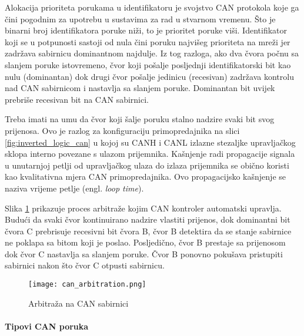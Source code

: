 Alokacija prioriteta porukama u identifikatoru je svojstvo CAN protokola koje ga čini pogodnim za upotrebu u sustavima za rad u stvarnom vremenu. Što je binarni broj identifikatora poruke niži, to je prioritet poruke viši. Identifikator koji se u potpunosti sastoji od nula čini poruku najvišeg prioriteta na mreži jer zadržava sabirnicu dominantnom najdulje. Iz tog razloga, ako dva čvora počnu sa slanjem poruke istovremeno, čvor koji pošalje posljednji identifikatorski bit kao nulu (dominantan) dok drugi čvor pošalje jedinicu (recesivan) zadržava kontrolu nad CAN sabirnicom i nastavlja sa slanjem poruke. Dominantan bit uvijek prebriše recesivan bit na CAN sabirnici.

Treba imati na umu da čvor koji šalje poruku stalno nadzire svaki bit svog prijenosa. Ovo je razlog za konfiguraciju primopredajnika na slici \ref{fig:inverted_logic_can} u kojoj su CANH i CANL izlazne stezaljke upravljačkog sklopa interno povezane s ulazom prijemnika. Kašnjenje radi propagacije signala u unutarnjoj petlji od upravljačkog ulaza do izlaza prijemnika se obično koristi kao kvalitativna mjera CAN primopredajnika. Ovo propagacijsko kašnjenje se naziva vrijeme petlje (engl. \textit{loop time}).

Slika \ref{fig:can_arbitration} prikazuje proces arbitraže kojim CAN kontroler automatski upravlja. Budući da svaki čvor kontinuirano nadzire vlastiti prijenos, dok dominantni bit čvora C prebrisuje recesivni bit čvora B, čvor B detektira da se stanje sabirnice ne poklapa sa bitom koji je poslao. Posljedično, čvor B prestaje sa prijenosom dok čvor C nastavlja sa slanjem poruke. Čvor B ponovno pokušava pristupiti sabirnici nakon što čvor C otpusti sabirnicu.

\begin{figure}[H]
	\centering
	\texttt{[image: can\_arbitration.png]}
	\caption{Arbitraža na CAN sabirnici \cite[str. 5]{can_manual}}
	\label{fig:can_arbitration}
\end{figure}

\paragraph{Tipovi CAN poruka}

